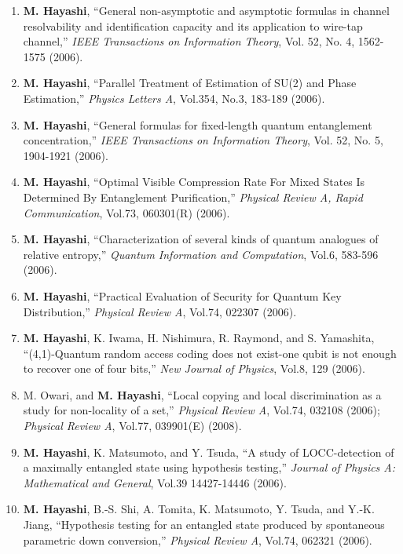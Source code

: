 \documentclass[a4paper,12pt,oneside]{article}
\begin{document}
\begin{enumerate}
\item
\textbf{M. Hayashi}, ``General non-asymptotic and asymptotic formulas in channel resolvability and identification capacity and its application to wire-tap channel,'' 
{\em IEEE Transactions on Information Theory}, Vol. 52, No. 4, 1562-1575 (2006).

\item
\textbf{M. Hayashi}, ``Parallel Treatment of Estimation of SU(2) and Phase Estimation,'' 
{\em Physics Letters A}, Vol.354, No.3, 183-189 (2006).

\item
\textbf{M. Hayashi}, ``General formulas for fixed-length quantum entanglement concentration,'' 
{\em IEEE Transactions on Information Theory}, Vol. 52, No. 5, 1904-1921 (2006).

\item
\textbf{M. Hayashi}, ``Optimal Visible Compression Rate For Mixed States Is Determined By Entanglement Purification,'' 
{\em Physical Review A, Rapid Communication}, Vol.73, 060301(R) (2006). 

\item
\textbf{M. Hayashi}, ``Characterization of several kinds of quantum analogues of relative entropy,'' 
{\em Quantum Information and Computation}, Vol.6, 583-596 (2006).

\item
\textbf{M. Hayashi}, ``Practical Evaluation of Security for Quantum Key Distribution,'' 
{\em Physical Review A}, Vol.74, 022307 (2006).

\item
\textbf{M. Hayashi}, K. Iwama, H. Nishimura, R. Raymond, and S. Yamashita, 
``(4,1)-Quantum random access coding does not exist-one qubit is not enough to recover one of four bits,'' 
{\em New Journal of Physics}, Vol.8, 129 (2006).

\item
M. Owari, and \textbf{M. Hayashi}, 
``Local copying and local discrimination as a study for non-locality of a set,'' 
{\em Physical Review A}, Vol.74, 032108 (2006); 
{\em Physical Review A}, Vol.77, 039901(E) (2008).

\item
\textbf{M. Hayashi}, K. Matsumoto, and Y. Tsuda, 
``A study of LOCC-detection of a maximally entangled state using hypothesis testing,'' 
{\em Journal of Physics A: Mathematical and General}, Vol.39 14427-14446 (2006).

\item
\textbf{M. Hayashi}, B.-S. Shi, A. Tomita, K. Matsumoto, Y. Tsuda, and Y.-K. Jiang, 
``Hypothesis testing for an entangled state produced by spontaneous parametric down conversion,'' 
{\em Physical Review A}, Vol.74, 062321 (2006).


\end{enumerate}
\end{document}
